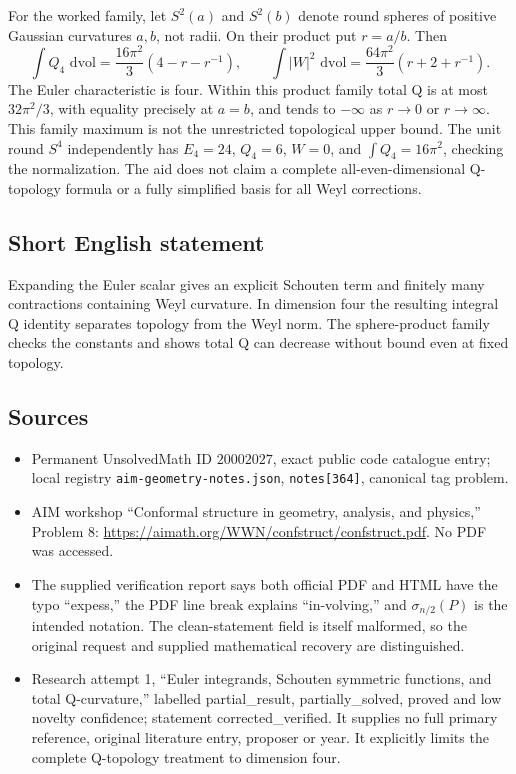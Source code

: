 \documentclass[11pt]{article}
\newcommand{\dd}{\,\mathrm{d}}
\begin{document}
For the worked family, let \(S^2(a)\) and \(S^2(b)\) denote round spheres of positive Gaussian curvatures \(a,b\), not radii. On their product put \(r=a/b\). Then
\[
 \int Q_4\,\dd\mathrm{vol}
 =\frac{16\pi^2}{3}(4-r-r^{-1}),\qquad
 \int|W|^2\,\dd\mathrm{vol}
 =\frac{64\pi^2}{3}(r+2+r^{-1}).
\]
The Euler characteristic is four. Within this product family total Q is at most \(32\pi^2/3\), with equality precisely at \(a=b\), and tends to \(-\infty\) as \(r\to0\) or \(r\to\infty\). This family maximum is not the unrestricted topological upper bound. The unit round \(S^4\) independently has \(E_4=24\), \(Q_4=6\), \(W=0\), and \(\int Q_4=16\pi^2\), checking the normalization. The aid does not claim a complete all-even-dimensional Q-topology formula or a fully simplified basis for all Weyl corrections.
\subsection{Short English statement}
Expanding the Euler scalar gives an explicit Schouten term and finitely many contractions containing Weyl curvature. In dimension four the resulting integral Q identity separates topology from the Weyl norm. The sphere-product family checks the constants and shows total Q can decrease without bound even at fixed topology.
\subsection{Sources}
\begin{itemize}
\item Permanent UnsolvedMath ID \(20002027\), exact public code catalogue entry; local registry \texttt{aim-geometry-notes.json}, \texttt{notes[364]}, canonical tag problem.
\item AIM workshop ``Conformal structure in geometry, analysis, and physics,'' Problem 8: \url{https://aimath.org/WWN/confstruct/confstruct.pdf}. No PDF was accessed.
\item The supplied verification report says both official PDF and HTML have the typo ``expess,'' the PDF line break explains ``in-volving,'' and \(\sigma_{n/2}(P)\) is the intended notation. The clean-statement field is itself malformed, so the original request and supplied mathematical recovery are distinguished.
\item Research attempt 1, ``Euler integrands, Schouten symmetric functions, and total Q-curvature,'' labelled partial\_result, partially\_solved, proved and low novelty confidence; statement corrected\_verified. It supplies no full primary reference, original literature entry, proposer or year. It explicitly limits the complete Q-topology treatment to dimension four.
\end{itemize}
\end{document}
